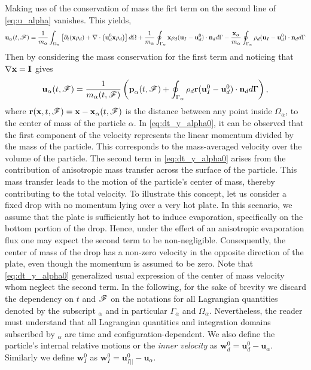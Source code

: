 Making use of the conservation of mass the firt term on the second line of \ref{eq:u_alpha} vanishes. This yields,%
\begin{equation}
    \textbf{u}_\alpha(t,\mathscr{F}) = 
    \frac{1}{m_\alpha}\int_{\Omega_{\alpha}}  \left[
        \partial_t (\textbf{x}\rho_d ) + \mathbf{\nabla}\cdot\left(\textbf{u}_d^0 \textbf{x} \rho_d\right) 
    \right] d\Omega \\
    + \frac{1}{m_\alpha}\oint_{\Gamma_{\alpha}}  \textbf{x} \rho_d(\textbf{u}_I   - \textbf{u}_d^0) \cdot \textbf{n}_d  d\Gamma
    -  \frac{\textbf{x}_\alpha}{m_\alpha}    \oint_{\Gamma_{\alpha}}  \rho_d(\textbf{u}_I   - \textbf{u}_d^0) \cdot \textbf{n}_d  d\Gamma
\end{equation}
Then by considering the mass conservation for the first term and noticing that $\mathbf{\nabla} \textbf{x} = \textbf{I}$ gives%
\begin{equation}
    \textbf{u}_\alpha(t,\mathscr{F}) = \frac{1}{m_\alpha(t,\mathscr{F})} \left(
        \textbf{p}_\alpha(t,\mathscr{F})
        +  \oint_{\Gamma_{\alpha}} \rho_d \textbf{r} (\textbf{u}_I^0 - \textbf{u}_d^0)\cdot \textbf{n}_d  d\Gamma
        \right),
        \label{eq:dt_y_alpha0}
\end{equation}
where $\textbf{r}(\textbf{x},t,\mathscr{F}) = \textbf{x} - \textbf{x}_\alpha(t,\mathscr{F})$ is the distance between any point inside $\Omega_\alpha$, to the center of mass of the particle $\alpha$.
In \ref{eq:dt_y_alpha0}, it can be observed that the first component of the velocity represents the linear momentum divided by the mass of the particle. 
This corresponds to the mass-averaged velocity over the volume of the particle.
The second term in \ref{eq:dt_y_alpha0} arises from the contribution of anisotropic mass transfer across the surface of the particle. 
This mass transfer leads to the motion of the particle's center of mass, thereby contributing to the total velocity.
To illustrate this concept, let us consider a fixed drop with no momentum lying over a very hot plate.
In this scenario, we assume that the plate is sufficiently hot to induce evaporation, specifically on the bottom portion of the drop.
Hence, under the effect of an anisotropic evaporation flux one may expect the second term to be non-negligible.
Consequently, the center of mass of the drop has a non-zero velocity in the opposite direction of the plate, even though the momentum is assumed to be zero.
Note that \ref{eq:dt_y_alpha0} generalized usual expression of the center of mass velocity whom neglect the second term.
In the following, for the sake of brevity we discard the dependency on $t$ and $\mathscr{F}$ on the notations for all Lagrangian quantities denoted by the subscript $_\alpha$ and in particular $\Gamma_\alpha$ and $\Omega_\alpha$.
Nevertheless, the reader must understand that all Lagrangian quantities and integration domains subscribed by $_\alpha$ are time and configuration-dependent. 
We also define the particle's internal relative motions or the \textit{inner velocity}  as $\textbf{w}_d^0 = \textbf{u}_d^0 - \textbf{u}_\alpha$. 
Similarly we define $\textbf{w}_I^0$ as $\textbf{w}_I^0 = \textbf{u}_{I||}^0 - \textbf{u}_\alpha$.


